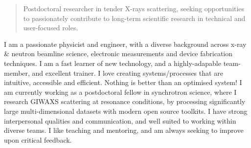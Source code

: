 \documentclass[10pt,a4paper,ragged2e,withhyper]{altacv}
\begin{document}
\begin{paracol}{2}
        \vspace{-0.2em}
            \begin{quote}
            	Postdoctoral researcher in tender X-rays scattering, seeking opportunities to passionately contribute to long-term scientific research in technical and user-focused roles.
            \end{quote}
        \vspace{0.5em}
		{\textalignment
		I am a passionate physicist and engineer, with a diverse background across x-ray \& neutron beamline science, electronic measurements and device fabrication techniques. I am a fast learner of new technology, and a highly-adapable team-member, and excellent trainer. I love creating systems/processes that are intuitive, accessible and efficient. Nothing is better than an optimised system! I am currently working as a postdoctoral fellow in synchrotron science, where I research GIWAXS scattering at resonance conditions, by processing significantly large multi-dimensional datasets with modern open source toolkits. I have strong interpersonal qualities and communication, and well suited to working within diverse teams. I like teaching and mentoring, and am always seeking to improve upon critical feedback.
		}
        
			

\end{paracol}
\end{document}
